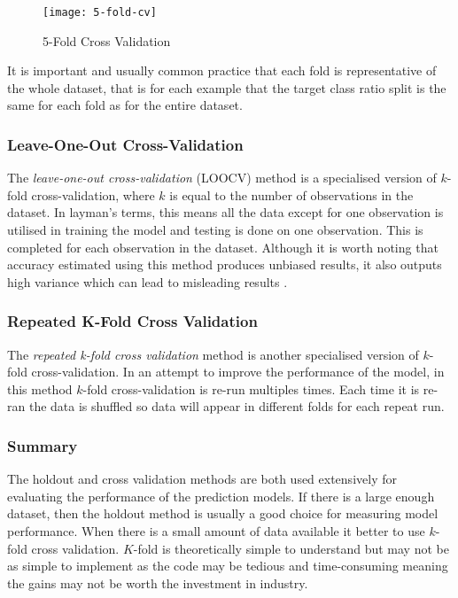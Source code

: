 \begin{figure}[H]
	\texttt{[image: 5-fold-cv]}
	\caption{5-Fold Cross Validation}
	\label{fig:5-fold-cv}
\end{figure}

It is important and usually common practice that each fold is representative of the whole dataset, that is for each example that the target class ratio split is the same for each fold as for the entire dataset. 

\subsubsection{Leave-One-Out Cross-Validation}
The \textit{leave-one-out cross-validation} (LOOCV) method is a specialised version of $k$-fold cross-validation, where $k$ is equal to the number of observations in the dataset. In layman's terms, this means all the data except for one observation is utilised in training the model and testing is done on one observation. This is completed for each observation in the dataset. Although it is worth noting that accuracy estimated using this method produces unbiased results, it also outputs high variance which can lead to misleading results \citep{refaeilzadeh_cross-validation_2009}.
 

\subsubsection{Repeated K-Fold Cross Validation}
The \textit{repeated k-fold cross validation} method is another specialised version of $k$-fold cross-validation. In an attempt to improve the performance of the model, in this method $k$-fold cross-validation is re-run multiples times. Each time it is re-ran the data is shuffled so data will appear in different folds for each repeat run. 

\subsubsection{Summary}

The holdout and cross validation methods are both used extensively for evaluating the performance of the prediction models. If there is a large enough dataset, then the holdout method is usually a good choice for measuring model performance. When there is a small amount of data available it better to use $k$-fold cross validation. $K$-fold is theoretically simple to understand but may not be as simple to implement as the code may be tedious and time-consuming meaning the gains may not be worth the investment in industry.

